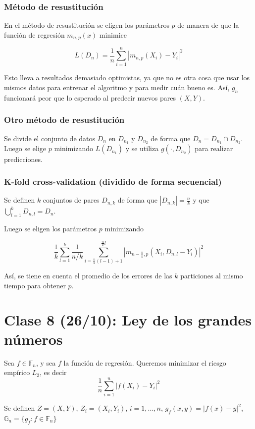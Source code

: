 \documentclass[12pt, a4paper]{article}
\begin{document}
\subsubsection{Método de resustitución}

En el método de resustitución se eligen los parámetros $p$ de manera de que la función de regresión $m_{n,p}(x)$ minimice

$$L(D_n) = \frac{1}{n} \sum_{i=1}^n | m_{n,p}(X_i)-Y_i |^2 $$

Esto lleva a resultados demasiado optimistas, ya que no es otra cosa que usar los mismos datos para entrenar el algoritmo y para medir cuán bueno es. Así, $g_n$ funcionará peor que lo esperado al predecir nuevos pares $(X,Y)$.

\subsubsection{Otro método de resustitución}

Se divide el conjunto de datos $D_n$ en $D_{n_1}$ y $D_{n_2}$ de forma que $D_n=D_{n_1} \cap D_{n_2}$. Luego se elige $p$ minimizando $L(D_{n_1})$ y se utiliza $g(\cdot,D_{n_2})$ para realizar predicciones.

\subsubsection{K-fold cross-validation (dividido de forma secuencial)}

Se definen $k$ conjuntos de pares $D_{n,k}$ de forma que $|D_{n,k}|=\frac{n}{k}$  y que $\bigcup_{l=1}^{k}D_{n,l}=D_n$.

Luego se eligen los parámetros $p$ minimizando

$$ \frac{1}{k} \sum_{l=1}^{k} \frac{1}{n/k} \sum_{i=\frac{n}{k}(l-1)+1}^{\frac{n}{k} l} | m_{n-\frac{n}{k},p}(X_i,D_{n,l} -Y_i) |^2 $$

Así, se tiene en cuenta el promedio de los errores de las $k$ particiones al mismo tiempo para obtener $p$.

\section{Clase 8 (26/10): Ley de los grandes números}

Sea $ f\in \mathds{F}_n$, y sea $f$ la función de regresión. Queremos minimizar el riesgo empírico $L_2$, es decir $$ \frac{1}{n} \sum_{i=1}^n |f(X_i)-Y_i|^2 $$

Se definen $Z=(X,Y)$, $Z_i=(X_i,Y_i)$, $i=1, ..., n$, $g_f(x,y)=|f(x)-y|^2$, $\mathds{G}_n=\{ g_f :f \in \mathds{F}_n\}$
\end{document}
